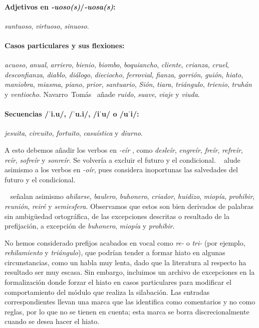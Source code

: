 \paragraph{Adjetivos en \textit{-uoso(s)}/\textit{-uosa(s)}:}{\textit{suntuoso}, \textit{virtuoso}, \textit{sinuoso}}.

\paragraph{Casos particulares y sus flexiones:}{\textit{acuoso}, \textit{anual},  \textit{arriero}, \textit{bienio}, \textit{biombo}, \textit{boquiancho}, \textit{cliente}, \textit{crianza}, \textit{cruel}, \textit{desconfianza}, \textit{diablo}, \textit{diálogo}, \textit{dieciocho}, \textit{ferrovial}, \textit{fianza}, \textit{gorrión}, \textit{guión}, \textit{hiato}, \textit{maniobra}, \textit{miasma}, \textit{piano}, \textit{prior}, \textit{santuario}, \textit{Sión}, \textit{tiara}, \textit{triángulo}, \textit{trienio}, \textit{truhán} y \textit{ventiocho}. Navarro~Tomás~\parencite*[68]{navarrotomas2004} añade \textit{ruido}, \textit{suave}, \textit{viaje} y \textit{viuda}.}

\paragraph{Secuencias /ˈi.u/, /ˈu.i/, /iˈu/ o /uˈi/:}{\textit{jesuita}, \textit{circuito}, \textit{fortuito}, \textit{casuística} y \textit{diurno}.}

A esto debemos añadir los verbos en \textit{-eír} \parencite[6.8.2.1.2.2]{riosmestre1999}, como \textit{desleír}, \textit{engreír}, \textit{freír}, \textit{refreír}, \textit{reír}, \textit{sofreír} y \textit{sonreír}. Se volvería a excluir el futuro y el condicional. \citeauthor{riosmestre1999}~\parencite*[6.8.2.1.2.3]{riosmestre1999} alude asimismo a los verbos en \textit{-oír}, pues considera inoportunas las salvedades del futuro y el condicional. 

\citeauthor{canellada1987}~\parencite*[51-52]{canellada1987} señalan asimismo \textit{ahilarse}, \textit{baulero}, \textit{buhonero}, \textit{criador}, \textit{huidizo}, \textit{miopía}, \textit{prohibir}, \textit{reunión}, \textit{reiré} y \textit{semiesfera}. Observamos que estos son bien derivados de palabras sin ambigüedad ortográfica, de las excepciones descritas o resultado de la prefijación, a excepción de \textit{buhonero}, \textit{miopía} y \textit{prohibir}.

No hemos considerado prefijos acabados en vocal como \textit{re-} o \textit{tri-} (por ejemplo, \textit{rehilamiento} y \textit{triángulo}), que podrían tender a formar hiato en algunas circunstancias, como un habla muy lenta, dado que la literatura al respecto ha resultado ser muy escasa. Sin embargo, incluimos un archivo de excepciones en la formalización donde forzar el hiato en casos particulares para modificar el comportamiento del módulo que realiza la silabación. Las entradas correspondientes llevan una marca que las identifica como comentarios y no como reglas, por lo que no se tienen en cuenta; esta marca se borra discrecionalmente cuando se desea hacer el hiato.

